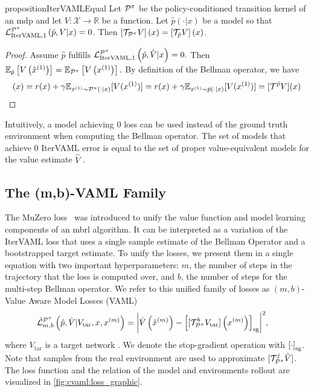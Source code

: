 \begin{restatable}{proposition}{IterVAMLEqual}{\textcite{itervaml}}\label{prop:cvaml:1_1}
    Let $\P^\pi$ be the policy-conditioned transition kernel of an \ac{mdp}   and let $V: \mathcal{X} \rightarrow \mathbb{R}$ be a function.
    Let $\hat{p}(\cdot|x)$ be a model so that ${\mathcal{L}}^{\P^\pi}_{\mathrm{IterVAML}, 1}\left(\hat{p},V|x\right) = 0$.
    Then $\squareb{\mathcal{T}_{\P^\pi} V }(x) = \squareb{\mathcal{T}_{\hat{p}} V }(x)$.
\end{restatable}
\begin{proof}
    Assume $\hat{p}$ fulfills ${\mathcal{L}}^{\P^\pi}_{\mathrm{IterVAML}, 1}\left(\hat{p},\hat{V}|x\right) = 0.$ Then $\mathbb{E}_{\hat{p}}\left[V\left(\hat{x}^{(1)}\right)\right] = \mathbb{E}_{\P^\pi}\left[V\left(x^{(1)}\right)\right].$ By definition of the Bellman operator, we have
    \begin{align}
        [\mathcal{T}^{\P^\pi} V](x) = r(x) + \gamma \mathbb{E}_{x^{(1)}\sim \P^\pi(\cdot|x)}[V(x^{(1)})] = r(x) + \gamma \mathbb{E}_{x^{(1)}\sim \hat{p}(\cdot|x)}[V(x^{(1)})] = [\mathcal{T}^{\hat{p}}V](x)
    \end{align}
\end{proof}

Intuitively, a model achieving $0$ loss can be used instead of the ground truth environment when computing the Bellman operator.
The set of models that achieve $0$ IterVAML error is equal to the set of proper value-equivalent models for the value estimate $\hat{V}$ \parencite{grimm2021proper}.

\subsection{The (m,b)-VAML Family}
The MuZero loss~\parencite{schrittwieser2020mastering} was introduced to unify the value function and model learning components of an \ac{mbrl} algorithm.
It can be interpreted as a variation of the IterVAML loss that uses a single sample estimate of the Bellman Operator and a bootstrapped target estimate. 
To unify the losses, we present them in a single equation with two important hyperparameters: $m$, the number of steps in the trajectory that the loss is computed over, and $b$, the number of steps for the multi-step Bellman operator.
We refer to this unified family of losses as $(m,b)$-Value Aware Model Losses (VAML)
\begin{align}
    & \hat{\mathcal{L}}^{\P^\pi}_{m,b}\left(\hat{p},\hat{V}|V_\mathrm{tar},x, x^{(m)}\right) = \biggl|\hat{V}\roundb{\hat{x}^{(m)}} - 
    \squareb{[\mathcal{T}_{\P^\pi}^b V_\mathrm{tar}]\roundb{x^{(m)}}}_\mathrm{sg}\biggr|^2, \label{eq:cvaml:dal_loss}
\end{align}
where $V_\mathrm{tar}$ is a target network \parencite{dqn}.
We denote the stop-gradient operation with $\squareb{\cdot}_\mathrm{sg}$.
Note that samples from the real environment are used to approximate $[\mathcal{T}_{\P^\pi}^j \hat{V}]$.
The loss function and the relation of the model and environments rollout are visualized in \autoref{fig:cvaml:loss_graphic}.

